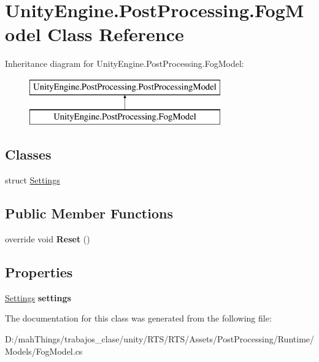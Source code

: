 \hypertarget{class_unity_engine_1_1_post_processing_1_1_fog_model}{}\section{Unity\+Engine.\+Post\+Processing.\+Fog\+Model Class Reference}
\label{class_unity_engine_1_1_post_processing_1_1_fog_model}
Inheritance diagram for Unity\+Engine.\+Post\+Processing.\+Fog\+Model\+:\begin{figure}[H]
\begin{center}
\leavevmode
\includegraphics[height=2.000000cm]{class_unity_engine_1_1_post_processing_1_1_fog_model}
\end{center}
\end{figure}
\subsection*{Classes}
\begin{DoxyCompactItemize}
\item 
struct \mbox{\hyperlink{struct_unity_engine_1_1_post_processing_1_1_fog_model_1_1_settings}{Settings}}
\end{DoxyCompactItemize}
\subsection*{Public Member Functions}
\begin{DoxyCompactItemize}
\item 
\mbox{\label{class_unity_engine_1_1_post_processing_1_1_fog_model_ac02075eb4d6e2eaa462eb33ab53c4753}} 
override void {\bfseries Reset} ()
\end{DoxyCompactItemize}
\subsection*{Properties}
\begin{DoxyCompactItemize}
\item 
\mbox{\label{class_unity_engine_1_1_post_processing_1_1_fog_model_a2c7449e70d9d2940455a8fe97644c112}} 
\mbox{\hyperlink{struct_unity_engine_1_1_post_processing_1_1_fog_model_1_1_settings}{Settings}} {\bfseries settings}
\end{DoxyCompactItemize}


The documentation for this class was generated from the following file\+:\begin{DoxyCompactItemize}
\item 
D\+:/mah\+Things/trabajos\+\_\+clase/unity/\+R\+T\+S/\+R\+T\+S/\+Assets/\+Post\+Processing/\+Runtime/\+Models/Fog\+Model.\+cs\end{DoxyCompactItemize}
